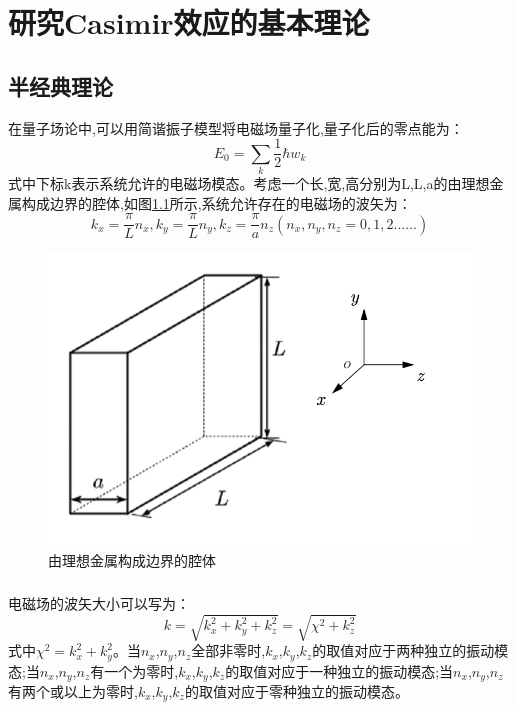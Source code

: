 \chapter{研究Casimir效应的基本理论}
\section{半经典理论}
在量子场论中,可以用简谐振子模型将电磁场量子化,量子化后的零点能为：
$$
E_0=\sum_k{\frac{1}{2} \hbar w_k}
$$
式中下标k表示系统允许的电磁场模态。考虑一个长,宽,高分别为L,L,a的由理想金属构成边界的腔体,如图\ref{fig:1}所示,系统允许存在的电磁场的波矢为：
$$
k_x=\frac{\pi}{L}n_x,k_y=\frac{\pi}{L}n_y,k_z=\frac{\pi}{a}n_z\left( n_x,n_y,n_z=0,1,2...... \right) 
$$
\begin{figure}[htb]
	\centering
	\includegraphics[width=0.7\linewidth]{figures/金属边界腔体}
	\caption{由理想金属构成边界的腔体}
	\label{fig:1}
\end{figure}
\paragraph*{}
电磁场的波矢大小可以写为：
$$
k=\sqrt{k_{x}^{2}+k_{y}^{2}+k_{z}^{2}}=\sqrt{\chi ^2+k_{z}^{2}}
$$
式中$\chi ^2=k_{x}^{2}+k_{y}^{2}$。当$n_x$,$n_y$,$n_z$全部非零时,$k_x$,$k_y$,$k_z$的取值对应于两种独立的振动模态;当$n_x$,$n_y$,$n_z$有一个为零时,$k_x$,$k_y$,$k_z$的取值对应于一种独立的振动模态;当$n_x$,$n_y$,$n_z$有两个或以上为零时,$k_x$,$k_y$,$k_z$的取值对应于零种独立的振动模态\cite{GuoShuohong_2008}。
